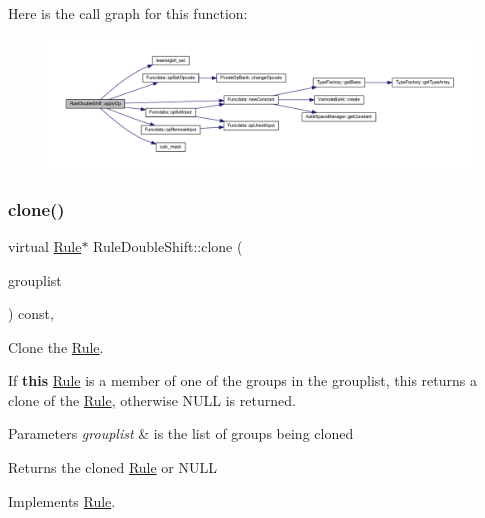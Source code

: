 Here is the call graph for this function\+:
\nopagebreak
\begin{figure}[H]
\begin{center}
\leavevmode
\includegraphics[width=350pt]{class_rule_double_shift_a02b2443037178261d417afd9689de91b_cgraph}
\end{center}
\end{figure}
\mbox{\label{class_rule_double_shift_a0ce602237ed14729b9365571e0b7e47f}} 
\subsubsection{\texorpdfstring{clone()}{clone()}}
{\footnotesize\ttfamily virtual \mbox{\hyperlink{class_rule}{Rule}}$\ast$ Rule\+Double\+Shift\+::clone (\begin{DoxyParamCaption}\item[{const \mbox{\hyperlink{class_action_group_list}{Action\+Group\+List}} \&}]{grouplist }\end{DoxyParamCaption}) const\hspace{0.3cm}{\ttfamily [inline]}, {\ttfamily [virtual]}}



Clone the \mbox{\hyperlink{class_rule}{Rule}}. 

If {\bfseries{this}} \mbox{\hyperlink{class_rule}{Rule}} is a member of one of the groups in the grouplist, this returns a clone of the \mbox{\hyperlink{class_rule}{Rule}}, otherwise N\+U\+LL is returned. 
\begin{DoxyParams}{Parameters}
{\em grouplist} & is the list of groups being cloned \\
\hline
\end{DoxyParams}
\begin{DoxyReturn}{Returns}
the cloned \mbox{\hyperlink{class_rule}{Rule}} or N\+U\+LL 
\end{DoxyReturn}


Implements \mbox{\hyperlink{class_rule_a70de90a76461bfa7ea0b575ce3c11e4d}{Rule}}.



